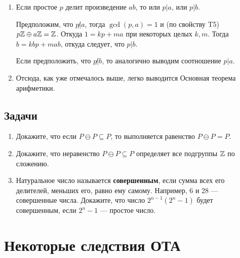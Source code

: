 \begin{enumerate}[T1]
\item Если простое $p$ делит произведение $ab$, то или $p|a$, или $p|b$.

Предположим, что $p\not|a$, тогда $\gcd(p,a)=1$ и (по свойству T5) $p\mathbb Z\oplus a\mathbb Z=\mathbb Z$. Откуда $1=kp+ma$ при некоторых целых $k,m$. Тогда $b=kbp+mab$, откуда следует, что $p|b$.

Если предположить, что $p\not|b$, то аналогично выводим соотношение $p|a$.
\item Отсюда, как уже отмечалось выше, легко выводится Основная теорема арифметики.
\end{enumerate}


\subsection*{Задачи}
\begin{enumerate}
\item Докажите, что если $P\ominus P\subseteq P$, то выполняется равенство $P\ominus P=P$.
\item Докажите, что неравенство $P\ominus P\subseteq P$ определяет все подгруппы $\mathbb Z$ по сложению.
\item Натуральное число называется \textbf{совершенным}, если сумма всех его делителей, меньших его, равно ему самому. Например, 6 и 28 --- совершенные числа. Докажите, что число $2^{n-1}(2^n-1)$ будет совершенным, если $2^n-1$ --- простое число.
\end{enumerate}


\section{Некоторые следствия ОТА}

